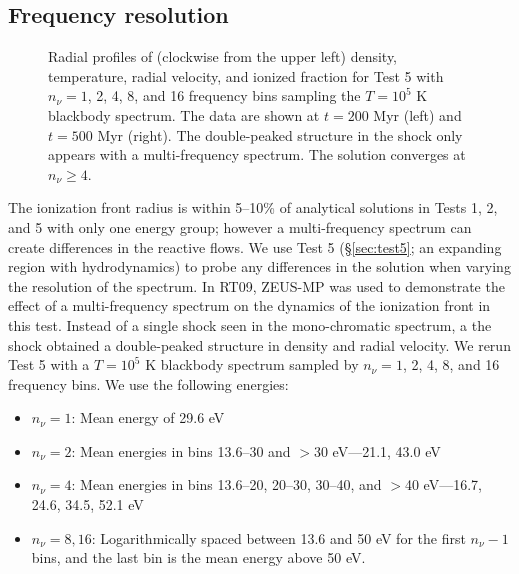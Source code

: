 \documentclass[apj,onecolumn]{emulateapj}
\begin{document}
\subsection{Frequency resolution}
\label{sec:nu_dep}

\begin{figure}[t]
  \caption{\label{fig:nu_dep} Radial profiles of (clockwise from the
    upper left) density, temperature, radial velocity, and ionized
    fraction for Test 5 with $n_\nu = 1$, 2, 4, 8, and 16 frequency
    bins sampling the $T=10^5$ K blackbody spectrum.  The data are
    shown at $t = 200$ Myr (left) and $t = 500$ Myr (right).  The
    double-peaked structure in the shock only appears with a
    multi-frequency spectrum.  The solution converges at $n_\nu \ge
    4$.}  
\end{figure}

The ionization front radius is within 5--10\% of analytical solutions
in Tests 1, 2, and 5 with only one energy group; however a
multi-frequency spectrum can create differences in the reactive
flows.  We use Test 5 (\S\ref{sec:test5}; an expanding 
region with hydrodynamics) to probe any differences in the solution
when varying the resolution of the spectrum.  In RT09, ZEUS-MP was
used to demonstrate the effect of a multi-frequency spectrum on the
dynamics of the ionization front in this test.  Instead of a single
shock seen in the mono-chromatic spectrum, a the shock obtained a
double-peaked structure in density and radial velocity.  We rerun Test
5 with a $T=10^5$ K blackbody spectrum sampled by $n_\nu = 1$, 2, 4,
8, and 16 frequency bins.  We use the following energies:
%
\begin{itemize}
\item $n_\nu = 1$: Mean energy of 29.6 eV
\item $n_\nu = 2$: Mean energies in bins 13.6--30 and $>$30 eV---21.1,
  43.0 eV
\item $n_\nu = 4$: Mean energies in bins 13.6--20, 20--30, 30--40, and
  $>$40 eV---16.7, 24.6, 34.5, 52.1 eV
\item $n_\nu = 8, 16$: Logarithmically spaced between 13.6 and 50 eV
  for the first $n_\nu-1$ bins, and the last bin is the mean energy
  above 50 eV.
\end{itemize}
\end{document}
